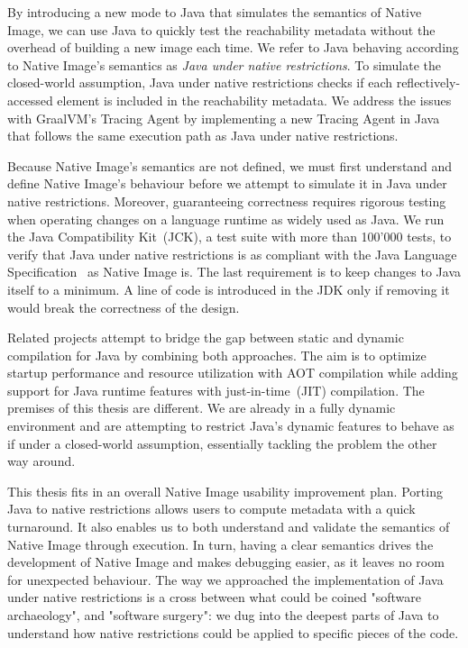 By introducing a new mode to Java that simulates the semantics of Native Image, we can use Java to quickly test the reachability metadata without the overhead of building a new image each time. We refer to Java behaving according to Native Image's semantics as \emph{Java under native restrictions}. To simulate the closed-world assumption, Java under native restrictions checks if each reflectively-accessed element is included in the reachability metadata. We address the issues with GraalVM's Tracing Agent by implementing a new Tracing Agent in Java that follows the same execution path as Java under native restrictions.

Because Native Image's semantics are not defined, we must first understand and define Native Image's behaviour before we attempt to simulate it in Java under native restrictions. Moreover, guaranteeing correctness requires rigorous testing when operating changes on a language runtime as widely used as Java. We run the Java Compatibility Kit~(JCK), a test suite with more than 100'000 tests, to verify that Java under native restrictions is as compliant with the Java Language Specification~\cite{noauthor_java_nodate-2} as Native Image is.
The last requirement is to keep changes to Java itself to a minimum. A line of code is introduced in the JDK only if removing it would break the correctness of the design.

Related projects attempt to bridge the gap between static and dynamic compilation for Java by combining both approaches. The aim is to optimize startup performance and resource utilization with AOT compilation while adding support for Java runtime features with just-in-time~(JIT) compilation. The premises of this thesis are different. We are already in a fully dynamic environment and are attempting to restrict Java's dynamic features to behave as if under a closed-world assumption, essentially tackling the problem the other way around. 

This thesis fits in an overall Native Image usability improvement plan. Porting Java to native restrictions allows users to compute metadata with a quick turnaround. It also enables us to both understand and validate the semantics of Native Image through execution. In turn, having a clear semantics drives the development of Native Image and makes debugging easier, as it leaves no room for unexpected behaviour.
The way we approached the implementation of Java under native restrictions is a cross between what could be coined "software archaeology", and "software surgery": we dug into the deepest parts of Java to understand how native restrictions could be applied to specific pieces of the code.


